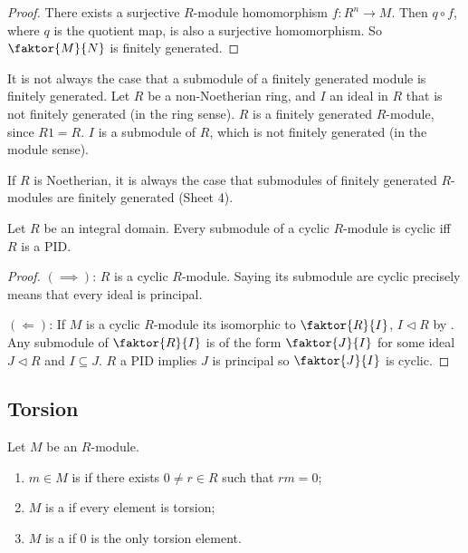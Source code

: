 \begin{proof}
	There exists a surjective $R$-module homomorphism $f : R^n \to M$.
	Then $q \circ f$, where $q$ is the quotient map, is also a surjective homomorphism.
	So $\faktor{M}{N}$ is finitely generated.
\end{proof}

\begin{example}
	It is not always the case that a submodule of a finitely generated module is finitely generated.
	Let $R$ be a non-Noetherian ring, and $I$ an ideal in $R$ that is not finitely generated (in the ring sense).
	$R$ is a finitely generated $R$-module, since $R1 = R$.
	$I$ is a submodule of $R$, which is not finitely generated (in the module sense).
\end{example}

\begin{remark}
	If $R$ is Noetherian, it is always the case that submodules of finitely generated $R$-modules are finitely generated (Sheet 4).
\end{remark}

\begin{lemma}
	Let $R$ be an integral domain.
	Every submodule of a cyclic $R$-module is cyclic iff $R$ is a PID.
\end{lemma} 

\begin{proof}
	$(\implies)$: $R$ is a cyclic $R$-module.
	Saying its submodule are cyclic precisely means that every ideal is principal.

	$(\Longleftarrow)$: If $M$ is a cyclic $R$-module its isomorphic to $\faktor{R}{I}$, $I \triangleleft R$ by .
	Any submodule of $\faktor{R}{I}$ is of the form $\faktor{J}{I}$ for some ideal $J \triangleleft R$ and $I \subseteq J$.
	$R$ a PID implies $J$ is principal so $\faktor{J}{I}$ is cyclic.
\end{proof} 

\subsection{Torsion}
\begin{definition}[Torsion]
	Let $M$ be an $R$-module.
	\begin{enumerate}
		\item $m \in M$ is  if there exists $0 \neq r \in R$ such that $rm = 0$;
		\item $M$ is a  if every element is torsion;
		\item $M$ is a  if 0 is the only torsion element.
	\end{enumerate}
\end{definition}

